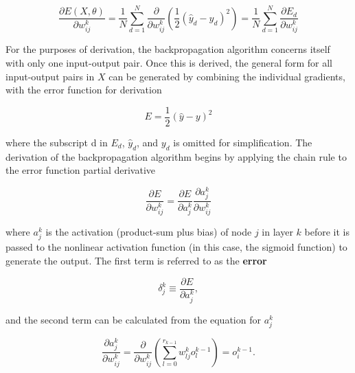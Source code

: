 \documentclass[main.tex]{subfiles}
\begin{document}
\begin{enumerate}
\begin{enumerate}
        \begin{equation} \label{partialErrorPartialWeightDecomposedSum}
        \frac{\partial E(X, \theta)}{\partial w_{i j}^{k}}=\frac{1}{N} \sum_{d=1}^{N} \frac{\partial}{\partial w_{i j}^{k}}\left(\frac{1}{2}\left(\hat{y}_{d}-y_{d}\right)^{2}\right)=\frac{1}{N} \sum_{d=1}^{N} \frac{\partial E_{d}}{\partial w_{i j}^{k}}
        \end{equation}
        
        For the purposes of derivation, the backpropagation algorithm concerns itself with only one input-output pair. Once this is derived, the general form for all input-output pairs in $X$ can be generated by combining the individual gradients, with the error function for derivation 
        
        \begin{equation} \label{errorFunction}
        E=\frac{1}{2}(\hat{y}-y)^{2}
        \end{equation}
        
        where the subscript d in $E_d$, $\hat{y}_d$, and $y_d$ is omitted for simplification. The derivation of the backpropagation algorithm begins by applying the chain rule to the error function partial derivative 
       
        \begin{equation} \label{partialErrorPartialWeightChainRule}
        \frac{\partial E}{\partial w_{i j}^{k}}=\frac{\partial E}{\partial a_{j}^{k}} \frac{\partial a_{j}^{k}}{\partial w_{i j}^{k}}
        \end{equation}
       
        where $a_j^k$ is the activation (product-sum plus bias) of node $j$ in layer $k$ before it is passed to the nonlinear activation function (in this case, the sigmoid function) to generate the output. The first term is referred to as the \textbf{error}
        
        \begin{equation} \label{error}
        \delta_{j}^{k} \equiv \frac{\partial E}{\partial a_{j}^{k}},
        \end{equation}
       
        and the second term can be calculated from the equation for $a_j^k$  
        
        \begin{equation} \label{partialActivationPartialWeight}
        \frac{\partial a_{j}^{k}}{\partial w_{i j}^{k}}=\frac{\partial}{\partial w_{i j}^{k}}\left(\sum_{l=0}^{r_{k-1}} w_{l j}^{k} o_{l}^{k-1}\right)=o_{i}^{k-1}.
        \end{equation}
        

\end{enumerate}
\end{enumerate}
\end{document}
